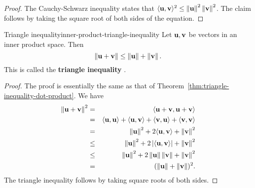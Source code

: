\begin{proof}
  The Cauchy-Schwarz inequality states that
  $\iprod{\vect{u},\vect{v}}^2 \leq
  \norm{\vect{u}}^2\norm{\vect{v}}^2$. The claim follows by taking the
  square root of both sides of the equation.
\end{proof}

\begin{proposition}{Triangle inequality}{inner-product-triangle-inequality}
  Let $\vect{u},\vect{v}$ be vectors in an inner product space. Then 
  \begin{equation*}
    \norm{\vect{u}+\vect{v}} \leq \norm{\vect{u}} + \norm{\vect{v}}.
  \end{equation*}
  This is called the \textbf{triangle inequality}%
  .
\end{proposition}

\begin{proof}
  The proof is essentially the same as that of
  Theorem~\ref{thm:triangle-inequality-dot-product}. We have
  \begin{eqnarray*}
    \norm{\vect{u}+\vect{v}}^{2}
    &=& \iprod{\vect{u}+\vect{v},\vect{u}+\vect{v}} \\
    &=& \iprod{\vect{u},\vect{u}}+\iprod{\vect{u},\vect{v}}+\iprod{\vect{v},\vect{u}}+\iprod{\vect{v},\vect{v}} \\
    &=&\norm{\vect{u}}^{2}+2\iprod{\vect{u},\vect{v}}+\norm{\vect{v}}^{2} \\
    &\leq& \norm{\vect{u}}^{2}+2\abs{\iprod{\vect{u},\vect{v}}}+\norm{\vect{v}}^{2} \\
    &\leq& \norm{\vect{u}}^{2}+2\norm{\vect{u}}\norm{\vect{v}}+\norm{\vect{v}}^{2} \\
    &=& (\norm{\vect{u}}+\norm{\vect{v}})^{2}.
  \end{eqnarray*}
  The triangle inequality follows by taking square roots of both sides.
\end{proof}
